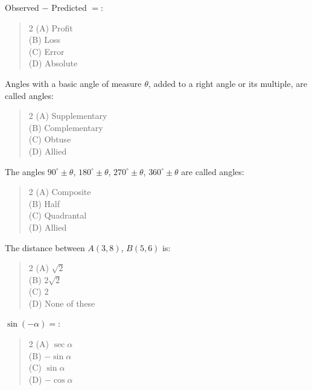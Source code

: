 \documentclass[11pt,a4paper]{article}
\begin{document}
\begin{mcqlist}
\item Observed $-$ Predicted $=$:
\begin{quote}\begin{multicols}{2}
\noindent (A) Profit \\
(B) Loss \\
(C) Error \\
(D) Absolute
\end{multicols}\end{quote}

\item Angles with a basic angle of measure $\theta$, added to a right angle or its multiple, are called \underline{\hspace{1.5cm}} angles:
\begin{quote}\begin{multicols}{2}
\noindent (A) Supplementary \\
(B) Complementary \\
(C) Obtuse \\
(D) Allied
\end{multicols}\end{quote}

\item The angles $90^{\circ}\pm\theta$, $180^{\circ}\pm\theta$, $270^{\circ}\pm\theta$, $360^{\circ}\pm\theta$ are called \underline{\hspace{1.5cm}} angles:
\begin{quote}\begin{multicols}{2}
\noindent (A) Composite \\
(B) Half \\
(C) Quadrantal \\
(D) Allied
\end{multicols}\end{quote}

\item The distance between $A(3,8)$, $B(5,6)$ is:
\begin{quote}\begin{multicols}{2}
\noindent (A) $\sqrt{2}$ \\
(B) $2\sqrt{2}$ \\
(C) $2$ \\
(D) None of these
\end{multicols}\end{quote}

\item $\sin(-\alpha) = $:
\begin{quote}\begin{multicols}{2}
\noindent (A) $\sec\alpha$ \\
(B) $-\sin\alpha$ \\
(C) $\sin\alpha$ \\
(D) $-\cos\alpha$
\end{multicols}\end{quote}


\end{mcqlist}
\end{document}
